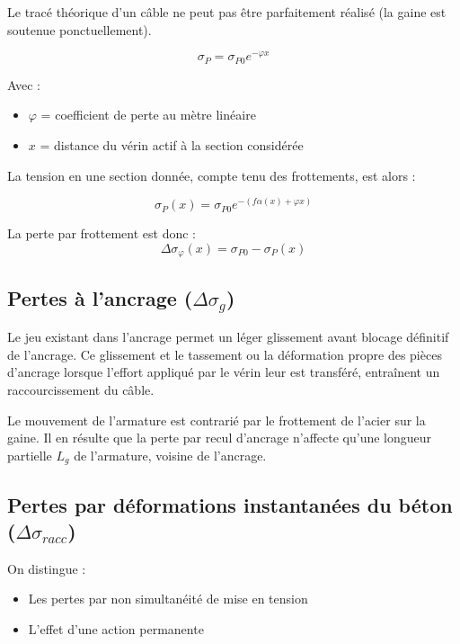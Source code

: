 \documentclass[12pt,a4paper]{article}
\begin{document}
Le tracé théorique d'un câble ne peut pas être parfaitement réalisé (la gaine est soutenue ponctuellement).

\begin{equation}
\sigma_P = \sigma_{P0} e^{-\varphi x}
\end{equation}

Avec :
\begin{itemize}
    \item $\varphi$ = coefficient de perte au mètre linéaire
    \item $x$ = distance du vérin actif à la section considérée
\end{itemize}

La tension en une section donnée, compte tenu des frottements, est alors :

\begin{equation}
\sigma_P(x) = \sigma_{P0} e^{-(f\alpha(x) + \varphi x)}
\end{equation}

La perte par frottement est donc :
\begin{equation}
\Delta \sigma_\varphi(x) = \sigma_{P0} - \sigma_P(x)
\end{equation}

\subsection{Pertes à l'ancrage ($\Delta \sigma_g$)}

Le jeu existant dans l'ancrage permet un léger glissement avant blocage définitif de l'ancrage. Ce glissement et le tassement ou la déformation propre des pièces d'ancrage lorsque l'effort appliqué par le vérin leur est transféré, entraînent un raccourcissement du câble.

Le mouvement de l'armature est contrarié par le frottement de l'acier sur la gaine. Il en résulte que la perte par recul d'ancrage n'affecte qu'une longueur partielle $L_g$ de l'armature, voisine de l'ancrage.

\subsection{Pertes par déformations instantanées du béton ($\Delta \sigma_{racc}$)}

On distingue :
\begin{itemize}
    \item Les pertes par non simultanéité de mise en tension
    \item L'effet d'une action permanente
\end{itemize}
\end{document}
